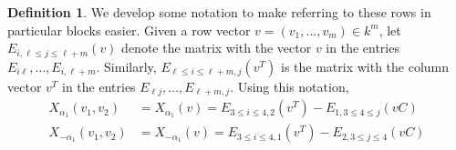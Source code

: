 \documentclass[12pt]{article}
\theoremstyle{definition}
\newtheorem{definition}[theorem]{Definition}
\begin{document}
\begin{definition}
We develop some notation to make referring to these rows in particular blocks easier. Given a row vector $v = (v_1, \ldots, v_{m}) \in k^{m}$, let $E_{i,\ell \le j \le \ell+m}(v)$ denote the matrix with the vector $v$ in the entries $E_{i\ell}, \ldots, E_{i, \ell+m}$. Similarly, $E_{\ell \le i \le \ell+m, j}(v^T)$ is the matrix with the column vector $v^T$ in the entries $E_{\ell j}, \ldots, E_{\ell+m,j}$. Using this notation,
\begin{align*}
	X_{\alpha_1}(v_1, v_2) &= X_{\alpha_1}(v) = E_{3 \le i \le 4, 2}(v^T) - E_{1, 3 \le 4 \le j}( vC) \\
	X_{-\alpha_1}(v_1, v_2) &= X_{-\alpha_1}(v) = E_{3 \le i \le 4, 1} (v^T) - E_{2, 3 \le j \le 4} ( vC)
\end{align*}
\end{definition}
\end{document}
